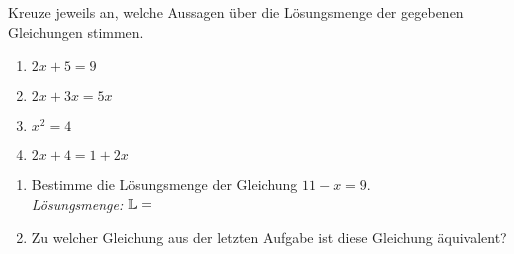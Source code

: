 \documentclass[solution]{uebungsblatt}
\begin{document}
\begin{exercise}
    Kreuze jeweils an, welche Aussagen über die Lösungsmenge der gegebenen Gleichungen stimmen.
    \begin{multicols}{4}
        \begin{enumerate}[label=\alph*)]
        \item $2x+5=9$
        \begin{multiplechoice}
            \citem $2\in\Solutions$
            \item $4\in\Solutions$
            \item $6\in\Solutions$
        \end{multiplechoice}

        \item $2x+3x=5x$

        \item $x^2=4$

        \item $2x+4=1+2x$
    \end{enumerate}
    \end{multicols}
\end{exercise}
\begin{exercise}
    \begin{enumerate}[label=\alph*)]
        \item Bestimme die Lösungsmenge der Gleichung $11-x=9$.\\
            \emph{Lösungsmenge:} $\mathbb{L}=$
        \item Zu welcher Gleichung aus der letzten Aufgabe ist diese Gleichung äquivalent?
        \begin{multicols}{4}
        \end{multicols}
    \end{enumerate}
\end{exercise}
\end{document}
